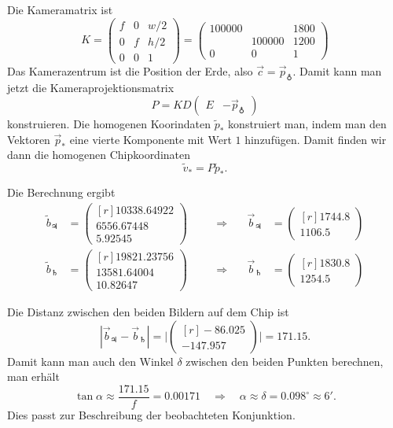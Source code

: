 \begin{loesung}
Die Kameramatrix ist
\[
K
=
\begin{pmatrix}
f&0&w/2\\
0&f&h/2\\
0&0& 1
\end{pmatrix}
=
\begin{pmatrix}
100000&      &1800\\
      &100000&1200\\
   0  &   0  &  1
\end{pmatrix}
\]
Das Kamerazentrum ist die Position der Erde, also $\vec{c}=\vec{p}_{\earth}$.
Damit kann man jetzt die Kameraprojektionsmatrix
\[
P = K D \begin{pmatrix} E&-\vec{p}_{\earth}\end{pmatrix}
\]
konstruieren.
Die homogenen Koorindaten $\tilde{p}_*$ konstruiert man, indem man den
Vektoren $\vec{p}_*$ eine vierte Komponente mit Wert $1$ hinzufügen.
Damit finden wir dann die homogenen Chipkoordinaten 
\[
\tilde{v}_* = P \tilde{p}_*.
\]
\begin{teilaufgaben}
\item
Die Berechnung ergibt
\[
\begin{aligned}
\tilde{b}_{\jupiter}
&=
\begin{pmatrix*}[r]
   10338.64922\\
    6556.67448\\
       5.92545
\end{pmatrix*}
&&\quad\Rightarrow\quad&
\vec{b}_{\jupiter}
&=
\begin{pmatrix*}[r]
   1744.8\\
   1106.5
\end{pmatrix*}
\\
\tilde{b}_{\saturn}
&=
\begin{pmatrix*}[r]
   19821.23756\\
   13581.64004\\
      10.82647
\end{pmatrix*}
&&\quad\Rightarrow\quad&
\vec{b}_{\saturn}
&=
\begin{pmatrix*}[r]
   1830.8\\
   1254.5
\end{pmatrix*}
\end{aligned}
\]
\item
Die Distanz zwischen den beiden Bildern auf dem Chip ist
\[
|\vec{b}_{\jupiter}-\vec{b}_{\saturn}|
=
\biggl|
\begin{pmatrix*}[r]
   -86.025\\
  -147.957
\end{pmatrix*}
\biggr|
=  171.15.
\]
Damit kann man auch den Winkel $\delta$ zwischen den beiden Punkten berechnen,
man erhält
\[
\tan \alpha \approx \frac{171.15}{f} = 0.00171
\quad\Rightarrow\quad
\alpha\approx
\delta =  0.098^\circ \approx 6'.
\]
Dies passt zur Beschreibung der beobachteten Konjunktion.
\qedhere
\end{teilaufgaben}
\end{loesung}

